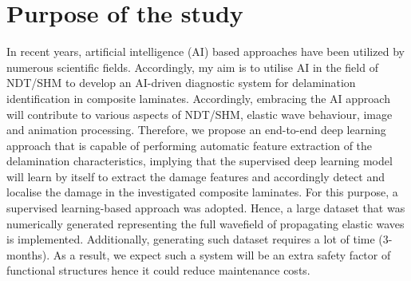 \section{Purpose of the study}
\label{sec12}
In recent years, artificial intelligence (AI) based approaches have been utilized by numerous scientific fields. 
Accordingly, my aim is to utilise AI in the field of NDT/SHM to develop an AI-driven diagnostic system for delamination identification in composite laminates. 
Accordingly, embracing the AI approach will contribute to various aspects of NDT/SHM, elastic wave behaviour, image and animation processing.
Therefore, we propose an end-to-end deep learning approach that is capable of performing automatic feature extraction of the delamination characteristics, implying that the supervised deep learning model will learn by itself to extract the damage features and accordingly detect and localise the damage in
the investigated composite laminates.
For this purpose, a supervised learning-based approach was adopted.
Hence, a large dataset that was numerically generated representing the full wavefield of propagating elastic waves is implemented.
Additionally, generating such dataset requires a lot of time (3-months). 
As a result, we expect such a system will be an extra safety factor of functional structures hence it could reduce
maintenance costs.
